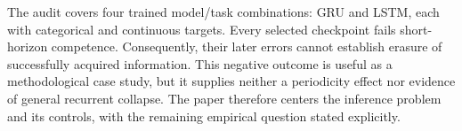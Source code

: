 The audit covers four trained model/task combinations: GRU and LSTM, each with categorical and continuous targets. Every selected checkpoint fails short-horizon competence. Consequently, their later errors cannot establish erasure of successfully acquired information. This negative outcome is useful as a methodological case study, but it supplies neither a periodicity effect nor evidence of general recurrent collapse. The paper therefore centers the inference problem and its controls, with the remaining empirical question stated explicitly.
